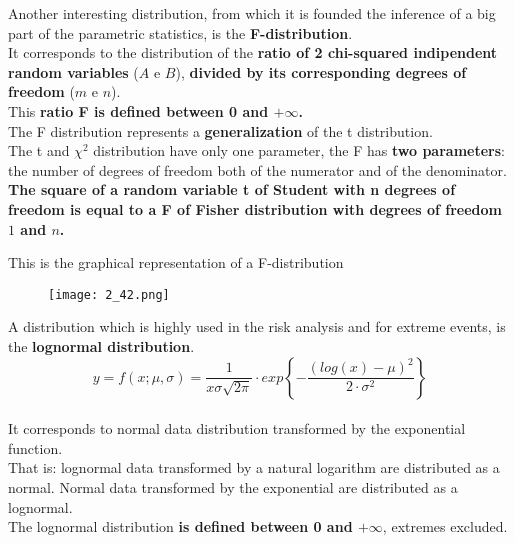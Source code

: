 
\begin{frame}
  Another interesting distribution, from which it is founded the inference of a big part of the parametric statistics, is the \textbf{F-distribution}.\\
  \vspace*{.2cm}
  It corresponds to the distribution of the \textbf{ratio of 2 chi-squared indipendent random variables} ($ A $ e $ B $), \textbf{divided by its corresponding degrees of freedom} ($ m $ e $ n $).\\
  \vspace*{.2cm}
  This \textbf{ratio F is defined between 0 and {\boldmath $ +\infty $}.}\\
  \vspace*{.2cm}
  The F distribution represents a \textbf{generalization} of the t distribution.\\
  \vspace*{.2cm}
  The t and $ \chi^2 $ distribution have only one parameter, the F has \textbf{two parameters}: the number of degrees of freedom both of the numerator and of the denominator.\\
  \vspace*{.2cm}
  \textbf{The square of a random variable t of Student with n degrees of freedom is equal to a F of Fisher distribution with degrees of freedom {\boldmath $ 1 $} and {\boldmath $ n $}.}
\end{frame}

\begin{frame}
\vspace*{.5cm}
\centering
This is the graphical representation of a F-distribution\\
\begin{figure}
\texttt{[image: 2\_42.png]}
\end{figure}
\end{frame}


\begin{frame}
  \vspace*{.25cm}
  A distribution which is highly used in the risk analysis and for extreme events, is the \textbf{lognormal distribution}. \\
  \vspace*{.35cm}
  $$ y = f(x; \mu, \sigma) = \frac{1}{x\sigma\sqrt{2\pi}}\cdot exp\left\{-\frac{(log(x)-\mu)^2}{2\cdot \sigma^2}\right\} $$ \\
  \vspace*{.35cm}
  It corresponds to normal data distribution transformed by the exponential function. \\
  \vspace*{.35cm}
  That is: lognormal data transformed by a natural logarithm are distributed as a normal. Normal data transformed by the exponential are distributed as a lognormal.\\
  \vspace*{.35cm}
  The lognormal distribution \textbf{is defined between 0 and {\boldmath$+\infty$}}, extremes excluded. \\
\end{frame}

